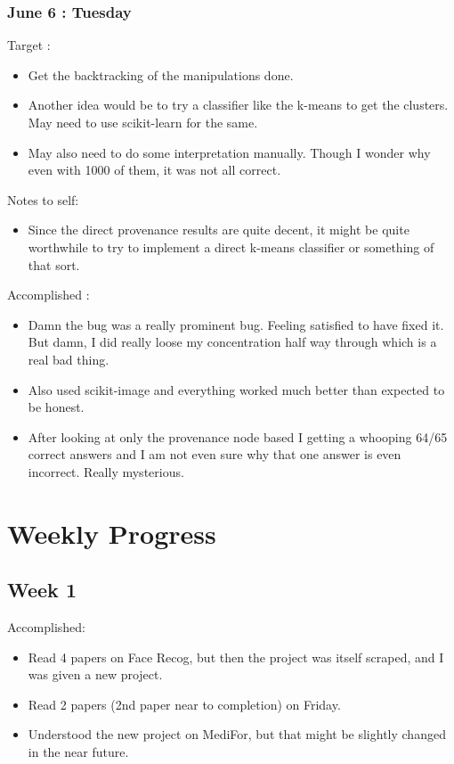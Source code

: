 \documentclass{article}
\begin{document}
\subsubsection{June 6 : Tuesday}
Target :
\begin{itemize}
\item Get the backtracking of the manipulations done.
\item Another idea would be to try a classifier like the k-means to get the clusters. May need to use scikit-learn for the same.
\item May also need to do some interpretation manually. Though I wonder why even with 1000 of them, it was not all correct.
\end{itemize}

Notes to self:
\begin{itemize}
\item Since the direct provenance results are quite decent, it might be quite worthwhile to try to implement a direct k-means classifier or something of that sort.
\end{itemize}

Accomplished :
\begin{itemize}
\item Damn the bug was a really prominent bug. Feeling satisfied to have fixed it. But damn, I did really loose my concentration half way through which is a real bad thing.
\item Also used scikit-image and everything worked much better than expected to be honest.
\item After looking at only the provenance node based I getting a whooping 64/65 correct answers and I am not even sure why that one answer is even incorrect. Really mysterious.
\end{itemize}

\section{Weekly Progress}
\subsection{Week 1}
Accomplished:
\begin{itemize}
\item Read 4 papers on Face Recog, but then the project was itself scraped, and I was given a new project.
\item Read 2 papers (2nd paper near to completion) on Friday.
\item Understood the new project on MediFor, but that might be slightly changed in the near future.
\end{itemize}
\end{document}

